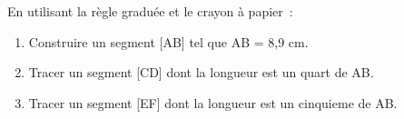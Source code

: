 \documentclass[exercice]{thedocument}%
\begin{document}
%
En utilisant la règle graduée et le crayon à papier~:
\begin{enumerate}
    \item Construire un segment [AB] tel que AB = 8,9 cm.
    \item Tracer un segment [CD] dont la longueur est un quart de AB.
    \item Tracer un segment [EF] dont la longueur est un cinquieme de AB.
\end{enumerate}
\end{document}
